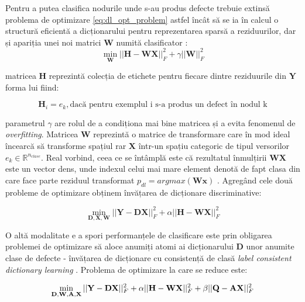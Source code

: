 Pentru a putea clasifica nodurile unde s-au produs defecte trebuie extinsă problema de optimizare \eqref{eq:dl_opt_problem} astfel încât să se ia în calcul o structură eficientă a dicționarului pentru reprezentarea sparsă a reziduurilor, dar și apariția unei noi matrici $\mathbf{W}$ numită clasificator \cite{DL_book}:
\begin{equation}
    \min_{\mathbf{W}} || \mathbf{H} - \mathbf{W}\mathbf{X}||_F^{2} + \gamma ||\mathbf{W}||^2_F
    \label{eq:dl_nmf}
\end{equation}

matricea $\mathbf{H}$ reprezintă colecția de etichete pentru fiecare dintre reziduurile din $\mathbf{Y}$
forma lui fiind:

\begin{equation}
    \mathbf{H}_i = e_k, \text{dacă pentru exemplul i s-a produs un defect în nodul k}
    \label{eq:struct_H}
\end{equation}

parametrul $\gamma$ are rolul de a condiționa mai bine matricea și a evita fenomenul de \textit{overfitting}.
Matricea $\mathbf{W}$ reprezintă o matrice de transformare care în mod ideal încearcă să transforme spațiul rar $\mathbf{X}$ într-un spațiu categoric de tipul versorilor $e_k \in \mathbb{R}^{n_{clase}}$. Real vorbind, ceea ce se întâmplă este că rezultatul înmulțirii $\mathbf{W}\mathbf{X}$ este un vector dens, unde indexul celui mai mare element denotă de fapt clasa din care face parte reziduul transformat $p_{dl} = argmax(\mathbf{W}\mathbf{x})$ \cite[Capitolul 8]{DL_book}. 
Agregând cele două probleme de optimizare obținem învățarea de dicționare discriminative:

\begin{equation}
    \min_{\mathbf{D}, \mathbf{X}, \mathbf{W}} || \mathbf{Y} - \mathbf{D} \mathbf{X} ||^2_F + \alpha || \mathbf{H} - \mathbf{W} \mathbf{X} ||^2_F
    \label{eq:disc_DL}
\end{equation}


O altă modalitate e a spori performanțele de clasificare este prin obligarea problemei de optimizare să aloce anumiți atomi ai dicționarului $\mathbf{D}$ unor anumite clase de defecte - învățarea de dicționare cu consistență de clasă \textit{label consistent dictionary learning} \cite{DL_book}. Problema de optimizare la care se reduce este:

\begin{equation}
    \min_{\mathbf{D}, \mathbf{W}, \mathbf{A}, \mathbf{X}} || \mathbf{Y} - \mathbf{D}\mathbf{X}||^2_F + \alpha ||\mathbf{H} - \mathbf{W} \mathbf{X} ||^2_F + \beta ||\mathbf{Q} - \mathbf{A}\mathbf{X} ||^2_F
    \label{eq:lc_dl}
\end{equation}

